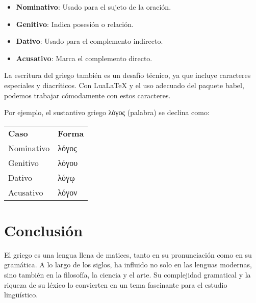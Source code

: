 \begin{itemize}
\item \textbf{Nominativo}: Usado para el sujeto de la oración.
\item \textbf{Genitivo}: Indica posesión o relación.
\item \textbf{Dativo}: Usado para el complemento indirecto.
\item \textbf{Acusativo}: Marca el complemento directo.
\end{itemize}

La escritura del griego también es un desafío técnico, ya que incluye caracteres especiales y diacríticos. Con LuaLaTeX y el uso adecuado del paquete babel, podemos trabajar cómodamente con estos caracteres.

\begin{example}
Por ejemplo, el sustantivo griego  λόγος  (palabra) se declina como:

\begin{tabular}{ll}
\textbf{Caso} & \textbf{Forma} \\
Nominativo & λόγος \\
Genitivo & λόγου \\
Dativo & λόγῳ \\
Acusativo & λόγον \\
\end{tabular}
\end{example}

\section{Conclusión}

El griego es una lengua llena de matices, tanto en su pronunciación como en su gramática. A lo largo de los siglos, ha influido no solo en las lenguas modernas, sino también en la filosofía, la ciencia y el arte. Su complejidad gramatical y la riqueza de su léxico lo convierten en un tema fascinante para el estudio lingüístico.

